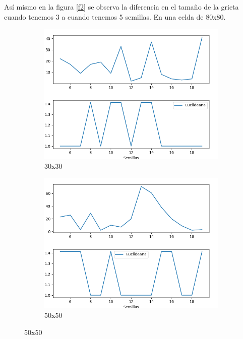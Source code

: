 \documentclass{article}
\begin{document}
 As\'i mismo en la figura \ref{f2} se observa la diferencia en el tama\~no de la grieta cuando tenemos 3 a cuando tenemos 5 semillas. En una celda de 80x80.

\begin{figure}[H]
       \centering
       \begin{subfigure}[b]{0.7\linewidth}
           \includegraphics[width=\linewidth]{30x30-5-20.png}
           \caption{30x30}
           \label{fig:westminster_lateral}
        \end{subfigure}
        \begin{subfigure}[b]{0.7\linewidth}
            \includegraphics[width=\linewidth]{50x505-20.png}
            \caption{50x50}
            \label{fig:westminster_aerea}

\end{subfigure}
\end{figure}
\end{document}
